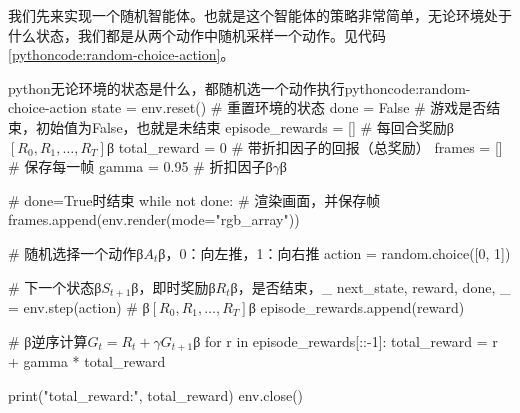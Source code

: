 \documentclass[lang=cn,newtx,10pt,scheme=chinese]{elegantbook}
\begin{document}
我们先来实现一个随机智能体。也就是这个智能体的策略非常简单，无论环境处于什么状态，我们都是从两个动作中随机采样一个动作。见代码\ref{pythoncode:random-choice-action}。

\begin{codebox}{python}{无论环境的状态是什么，都随机选一个动作执行}{pythoncode:random-choice-action}
state = env.reset() # 重置环境的状态
done = False # 游戏是否结束，初始值为False，也就是未结束
episode_rewards = []  # 每回合奖励β$[R_0, R_1, \dots, R_T]$β
total_reward = 0 # 带折扣因子的回报（总奖励）
frames = []         # 保存每一帧
gamma = 0.95 # 折扣因子β$\gamma$β

# done=True时结束
while not done:
    # 渲染画面，并保存帧
    frames.append(env.render(mode="rgb_array"))

    # 随机选择一个动作β$A_t$β，0：向左推，1：向右推
    action = random.choice([0, 1])

    # 下一个状态β$S_{t+1}$β，即时奖励β$R_t$β，是否结束，_
    next_state, reward, done, _ = env.step(action)
    # β$[R_0, R_1, \dots, R_T]$β
    episode_rewards.append(reward)

# β逆序计算$G_t = R_t + \gamma G_{t+1}$β
for r in episode_rewards[::-1]:
    total_reward = r + gamma * total_reward

print("total_reward:", total_reward)
env.close()
\end{codebox}

\begin{marker}
\end{marker}
\end{document}
